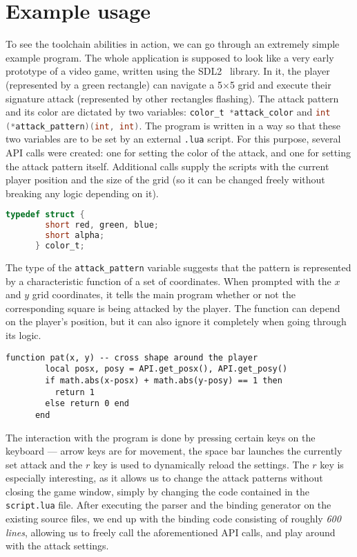 \documentclass[polish, english]{iithesis}
\begin{document}
  \section{Example usage}
    To see the toolchain abilities in action, we can go through an extremely simple example program.
    The whole application is supposed to look like a very early prototype of a video game, written using the SDL2~\cite{sdl2} library.
    In it, the player (represented by a green rectangle) can navigate a 5$\times$5 grid and execute their signature attack (represented by other rectangles flashing).
    The attack pattern and its color are dictated by two variables: \lstinline[language=c]|color_t *attack_color| and \lstinline[language=c]|int (*attack_pattern)(int, int)|.
    The program is written in a way so that these two variables are to be set by an external \texttt{.lua} script.
    For this purpose, several API calls were created: one for setting the color of the attack, and one for setting the attack pattern itself.
    Additional calls supply the scripts with the current player position and the size of the grid (so it can be changed freely without breaking any logic depending on it).
    \begin{lstlisting}[language=c, caption=\texttt{color\_t type definition}]
      typedef struct {
        short red, green, blue;
        short alpha;
      } color_t;
    \end{lstlisting}

    The type of the \texttt{attack\_pattern} variable suggests that the pattern is represented by a characteristic function of a set of coordinates.
    When prompted with the $x$ and $y$ grid coordinates, it tells the main program whether or not the corresponding square is being attacked by the player.
    The function can depend on the player's position, but it can also ignore it completely when going through its logic.
    \begin{lstlisting}[language={[5.2]Lua}, caption=Example pattern dictating function]
      function pat(x, y) -- cross shape around the player
        local posx, posy = API.get_posx(), API.get_posy()
        if math.abs(x-posx) + math.abs(y-posy) == 1 then 
          return 1
        else return 0 end
      end 
    \end{lstlisting}

    The interaction with the program is done by pressing certain keys on the keyboard --- arrow keys are for movement, the space bar launches the currently set attack and the $r$ key is used to dynamically reload the settings.
    The $r$ key is especially interesting, as it allows us to change the attack patterns without closing the game window, simply by changing the code contained in the \texttt{script.lua} file.
    After executing the parser and the binding generator on the existing source files, we end up with the binding code consisting of roughly \textit{600 lines}, allowing us to freely call the aforementioned API calls, and play around with the attack settings.
\end{document}
